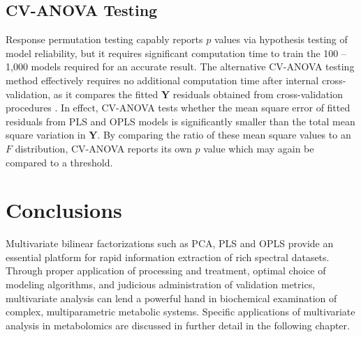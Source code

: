 \subsection{CV-ANOVA Testing}

\begin{doublespace}
Response permutation testing capably reports $p$ values via hypothesis testing
of model reliability, but it requires significant computation time to train
the 100 -- 1,000 models required for an accurate result. The alternative
CV-ANOVA testing method effectively requires no additional computation time
after internal cross-validation, as it compares the fitted $\mathbf{Y}$
residuals obtained from cross-validation procedures \cite{eriksson:jchemo2008}.
In effect, CV-ANOVA tests whether the mean square error of fitted residuals
from PLS and OPLS models is significantly smaller than the total mean square
variation in $\mathbf{Y}$. By comparing the ratio of these mean square values
to an $F$ distribution, CV-ANOVA reports its own $p$ value which may again be
compared to a threshold.
\end{doublespace}

\section{Conclusions}

\begin{doublespace}
Multivariate bilinear factorizations such as PCA, PLS and OPLS provide an
essential platform for rapid information extraction of rich spectral datasets.
Through proper application of processing and treatment, optimal choice of
modeling algorithms, and judicious administration of validation metrics,
multivariate analysis can lend a powerful hand in biochemical examination of
complex, multiparametric metabolic systems. Specific applications of
multivariate analysis in metabolomics are discussed in further detail in the
following chapter.
\end{doublespace}




